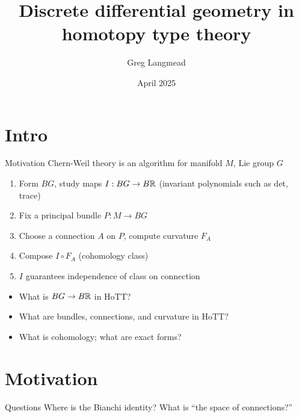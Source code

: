 \documentclass[14pt,aspectratio=169,compress]{beamer}
\title[Geometry in HoTT]{Discrete differential geometry in homotopy type theory}
\author{Greg Langmead}
\institute[CMU]{Carnegie Mellon University}
\date{April 2025}
\begin{document}
\begin{frame}
\titlepage
\end{frame}

\begin{frame}
\tableofcontents
\end{frame}


\section{Intro}

\begin{frame}{Motivation}
Chern-Weil theory is an algorithm for manifold \( M \), Lie group \( G \)
\begin{enumerate}
\item<2-> Form \( BG \), study maps \( I:BG\to B\mathbb{R} \) (invariant polynomials such as det, trace)
\item<3-> Fix a principal bundle \( P:M\to BG \)
\item<4-> Choose a connection \( A \) on \( P \), compute curvature \( F_A \)
\item<5-> Compose \( I\circ F_A \) (cohomology class)
\item<6-> \( I \) guarantees independence of class on connection
\end{enumerate}
\end{frame}

\begin{frame}
\begin{itemize}
\item What is \( BG\to B\mathbb{R} \) in HoTT?
\item What are bundles, connections, and curvature in HoTT?
\item What is cohomology; what are exact forms?
\end{itemize}
\end{frame}

\section{Motivation}

\begin{frame}{Questions}
Where is the Bianchi identity?
What is ``the space of connections?''
\end{frame}
\end{document}
